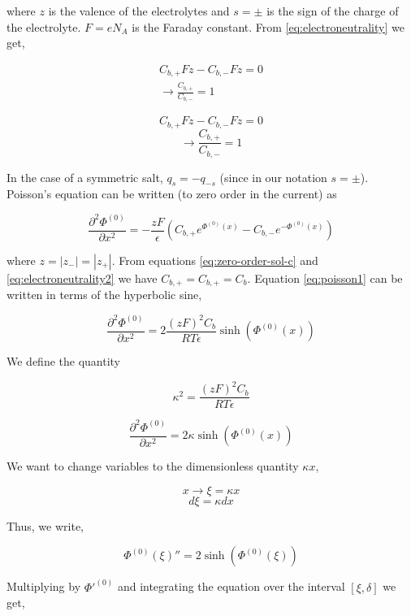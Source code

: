 where $z$ is the valence of the electrolytes and $s = \pm$ is the sign of the charge of the electrolyte. $F = eN_A$ is the Faraday constant. From \ref{eq:electroneutrality} we get,

\begin{eqnarray}\nonumber
C_{b,+}Fz-C_{b,-}Fz=0\\
\rightarrow \frac{C_{b,+}}{C_{b,-}}=1
\label{eq:electroneutrality2}
\end{eqnarray}

$$C_{b,+}Fz-C_{b,-}Fz=0$$
$$\rightarrow \frac{C_{b,+}}{C_{b,-}}=1$$

In the case of a symmetric salt, $q_s=-q_{-s}$ (since in our notation $s=\pm$). Poisson's equation can be written (to zero order in the current) as

\begin{equation}
\label{eq:poisson1}
\frac{\partial^2 \Phi^{(0)}}{\partial x^2} = -\frac{zF}{\epsilon} \left(C_{b,+}e^{\Phi^{(0)}(x)}-C_{b,-}e^{-\Phi^{(0)}(x)}\right)
\end{equation}

where $z=|z_-|=|z_+|$. From equations \ref{eq:zero-order-sol-c}  and \ref{eq:electroneutrality2} we have $C_{b,+}=C_{b,+} = C_b$. Equation \ref{eq:poisson1} can be written in terms of the hyperbolic sine,

\begin{equation}
\label{eq:poisson2}
\frac{\partial^2 \Phi^{(0)}}{\partial x^2} = 2\frac{(zF)^2C_b}{RT\epsilon}\sinh{\left(\Phi^{(0)}(x)\right)}
\end{equation}

We define the quantity  

$$\kappa^2  = \frac{(zF)^2C_b}{RT\epsilon}$$

\begin{equation}
\frac{\partial^2 \Phi^{(0)}}{\partial x^2} = 2\kappa \sinh{\left(\Phi^{(0)}(x)\right)}
\end{equation}

We want to change variables to the dimensionless quantity $\kappa x$,

$$x \rightarrow \xi = \kappa x$$
 $$d \xi  = \kappa d x $$
 
Thus, we write,

\begin{equation}
\Phi^{(0)}(\xi)''= 2\sinh{\left(\Phi^{(0)}(\xi)\right)}
\end{equation}

Multiplying by  $\Phi'^{(0)}$ and integrating the equation over the interval $[\xi, \delta]$ we get,
 
